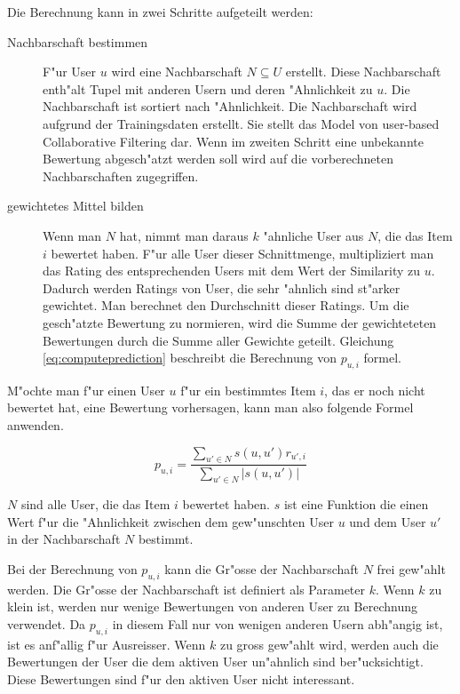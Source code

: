 \documentclass[a4paper, 12pt]{article}
\begin{document}
Die Berechnung kann in zwei Schritte aufgeteilt werden:
\begin{description}
\item[Nachbarschaft bestimmen] F"ur User $u$ wird eine Nachbarschaft $N \subseteq U$ erstellt. Diese Nachbarschaft enth"alt Tupel mit anderen Usern und deren "Ahnlichkeit zu $u$. Die Nachbarschaft ist sortiert nach "Ahnlichkeit. Die Nachbarschaft wird aufgrund der Trainingsdaten erstellt. Sie stellt das Model von user-based Collaborative Filtering dar. Wenn im zweiten Schritt eine unbekannte Bewertung abgesch"atzt werden soll wird auf die vorberechneten Nachbarschaften zugegriffen.
\item [gewichtetes Mittel bilden] Wenn man $N$ hat, nimmt man daraus $k$ "ahnliche User aus $N$, die das Item $i$ bewertet haben. F"ur alle User dieser Schnittmenge, multipliziert man das Rating des entsprechenden Users mit dem Wert der Similarity zu $u$. Dadurch werden Ratings von User, die sehr "ahnlich sind st"arker gewichtet. Man berechnet den Durchschnitt dieser Ratings. Um die gesch"atzte Bewertung zu normieren, wird die Summe der gewichteteten Bewertungen durch die Summe aller Gewichte geteilt. Gleichung \ref{eq:computeprediction} beschreibt die Berechnung von $p_{u,i}$ formel.
\end{description}

M"ochte man f"ur einen User $u$ f"ur ein bestimmtes Item $i$, das er noch nicht bewertet hat, eine Bewertung vorhersagen, kann man also folgende Formel anwenden.

\begin{equation}
  \label{eq:computeprediction}
  p_{u,i} = \frac{\sum_{u' \in N}{s(u,u') r_{u',i}}}{\sum_{u' \in N}{|s(u,u')|}}
\end{equation}

$N$ sind alle User, die das Item $i$ bewertet haben. $s$ ist eine Funktion die einen Wert f"ur die "Ahnlichkeit zwischen dem gew"unschten User $u$ und dem User $u'$ in der Nachbarschaft $N$ bestimmt.

Bei der Berechnung von $p_{u,i}$ kann die Gr"osse der Nachbarschaft $N$ frei gew"ahlt werden. Die Gr"osse der Nachbarschaft ist definiert als Parameter $k$. Wenn $k$ zu klein ist, werden nur wenige Bewertungen von anderen User zu Berechnung verwendet. Da $p_{u,i}$ in diesem Fall nur von wenigen anderen Usern abh"angig ist, ist es anf"allig f"ur Ausreisser. Wenn $k$ zu gross gew"ahlt wird, werden auch die Bewertungen der User die dem aktiven User un"ahnlich sind ber"ucksichtigt. Diese Bewertungen sind f"ur den aktiven User nicht interessant. 
\end{document}
